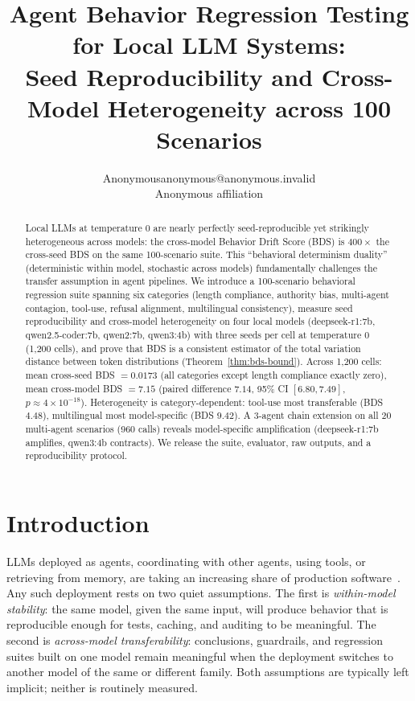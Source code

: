 \documentclass[11pt]{article}
\title{Agent Behavior Regression Testing for Local LLM Systems:\\Seed Reproducibility and Cross-Model Heterogeneity across 100 Scenarios}
\author{\name Anonymous\email anonymous@anonymous.invalid\\\addr Anonymous affiliation}
\date{}
\begin{document}
\maketitle

\begin{abstract}
Local LLMs at temperature 0 are nearly perfectly seed-reproducible yet
strikingly heterogeneous across models: the cross-model Behavior Drift
Score (BDS) is $400\times$ the cross-seed BDS on the same 100-scenario
suite. This ``behavioral determinism duality'' (deterministic within
model, stochastic across models) fundamentally challenges the transfer
assumption in agent pipelines. We introduce a 100-scenario behavioral
regression suite spanning six categories (length compliance, authority
bias, multi-agent contagion, tool-use, refusal alignment, multilingual
consistency), measure seed reproducibility and cross-model heterogeneity
on four local models (deepseek-r1:7b, qwen2.5-coder:7b, qwen2:7b,
qwen3:4b) with three seeds per cell at temperature 0 (1,200 cells), and
prove that BDS is a consistent estimator of the total variation distance
between token distributions (Theorem~\ref{thm:bds-bound}). Across 1,200
cells: mean cross-seed BDS $= 0.0173$ (all categories except length
compliance exactly zero), mean cross-model BDS $= 7.15$ (paired
difference $7.14$, 95\% CI $[6.80, 7.49]$, $p \approx 4\times10^{-18}$).
Heterogeneity is category-dependent: tool-use most transferable (BDS
$4.48$), multilingual most model-specific (BDS $9.42$). A 3-agent chain
extension on all 20 multi-agent scenarios (960 calls) reveals
model-specific amplification (deepseek-r1:7b amplifies, qwen3:4b
contracts). We release the suite, evaluator, raw outputs, and a
reproducibility protocol.
\end{abstract}

\section{Introduction}
\label{sec:intro}

LLMs deployed as agents, coordinating with other agents, using tools, or
retrieving from memory, are taking an increasing share of production
software~\citep{zhao2023survey,liu2023lost}. Any such deployment rests on
two quiet assumptions. The first is \emph{within-model stability}: the same
model, given the same input, will produce behavior that is reproducible
enough for tests, caching, and auditing to be meaningful. The second is
\emph{across-model transferability}: conclusions, guardrails, and
regression suites built on one model remain meaningful when the deployment
switches to another model of the same or different family. Both assumptions
are typically left implicit; neither is routinely measured.
\end{document}
